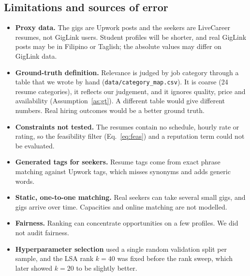 \documentclass[12pt,a4paper]{article}
\numberwithin{equation}{section}
\theoremstyle{definition}
\theoremstyle{plain}
\begin{document}
\subsection{Limitations and sources of error}\label{sec:limits}
\begin{itemize}[nosep]
  \item \textbf{Proxy data.} The gigs are Upwork posts and the seekers are LiveCareer resumes, not GigLink users. Student profiles will be shorter, and real GigLink posts may be in Filipino or Taglish; the absolute values may differ on GigLink data.
  \item \textbf{Ground-truth definition.} Relevance is judged by job category through a table that we wrote by hand (\texttt{data/category\_map.csv}). It is coarse (24 resume categories), it reflects our judgement, and it ignores quality, price and availability (Assumption~\ref{as:gt}). A different table would give different numbers. Real hiring outcomes would be a better ground truth.
  \item \textbf{Constraints not tested.} The resumes contain no schedule, hourly rate or rating, so the feasibility filter (Eq.~\ref{eq:feas}) and a reputation term could not be evaluated.
  \item \textbf{Generated tags for seekers.} Resume tags come from exact phrase matching against Upwork tags, which misses synonyms and adds generic words.
  \item \textbf{Static, one-to-one matching.} Real seekers can take several small gigs, and gigs arrive over time. Capacities and online matching are not modelled.
  \item \textbf{Fairness.} Ranking can concentrate opportunities on a few profiles. We did not audit fairness.
  \item \textbf{Hyperparameter selection} used a single random validation split per sample, and the LSA rank $k=40$ was fixed before the rank sweep, which later showed $k=20$ to be slightly better.
\end{itemize}
\end{document}
